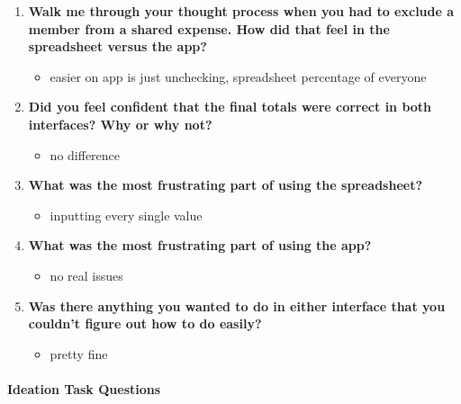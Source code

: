 \documentclass[12pt,a4paper]{article}
\begin{document}
\begin{enumerate}
    \item \textbf{Walk me through your thought process when you had to exclude a member from a shared expense. How did that feel in the spreadsheet versus the app?}
    
    \begin{itemize}
        \item easier on app is just unchecking, spreadsheet percentage of everyone
    \end{itemize}
    
    \item \textbf{Did you feel confident that the final totals were correct in both interfaces? Why or why not?}
    
    \begin{itemize}
        \item no difference
    \end{itemize}
    
    \item \textbf{What was the most frustrating part of using the spreadsheet?}
    
    \begin{itemize}
        \item inputting every single value
    \end{itemize}
    
    \item \textbf{What was the most frustrating part of using the app?}
    
    \begin{itemize}
        \item no real issues
    \end{itemize}
    
    \item \textbf{Was there anything you wanted to do in either interface that you couldn't figure out how to do easily?}
    
    \begin{itemize}
        \item pretty fine
    \end{itemize}
\end{enumerate}

\paragraph{Ideation Task Questions}
\end{document}
